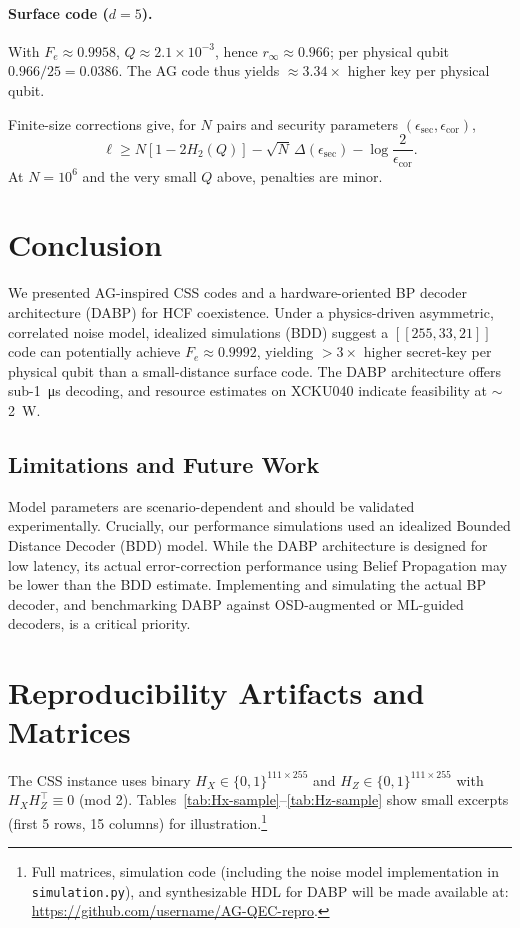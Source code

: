 \paragraph*{Surface code (\(d=5\)).}
With \(F_e\approx0.9958\), \(Q\approx2.1\times10^{-3}\), hence \(r_\infty\approx0.966\); per physical qubit \(0.966/25=0.0386\). The AG code thus yields \(\approx3.34\times\) higher key per physical qubit.

Finite-size corrections give, for \(N\) pairs and security parameters \((\epsilon_{\mathrm{sec}},\epsilon_{\mathrm{cor}})\),
\begin{equation}
\ell \ge N\!\left[1-2H_2(Q)\right]-\sqrt{N}\,\Delta(\epsilon_{\mathrm{sec}})-\log\frac{2}{\epsilon_{\mathrm{cor}}}.
\end{equation}
At \(N=10^6\) and the very small \(Q\) above, penalties are minor.

\section{Conclusion}\label{sec:conclusion}
We presented AG-inspired CSS codes and a hardware-oriented BP decoder architecture (DABP) for HCF coexistence. Under a physics-driven asymmetric, correlated noise model, idealized simulations (BDD) suggest a \( [[255,33,21]] \) code can potentially achieve \(F_e\approx0.9992\), yielding \(>\!3\times\) higher secret-key per physical qubit than a small-distance surface code. The DABP architecture offers sub-\SI{1}{\micro\second} decoding, and resource estimates on XCKU040 indicate feasibility at \(\sim\)\SI{2}{\watt}.

\subsection*{Limitations and Future Work}
Model parameters are scenario-dependent and should be validated experimentally. Crucially, our performance simulations used an idealized Bounded Distance Decoder (BDD) model. While the DABP architecture is designed for low latency, its actual error-correction performance using Belief Propagation may be lower than the BDD estimate. Implementing and simulating the actual BP decoder, and benchmarking DABP against OSD-augmented or ML-guided decoders, is a critical priority.

\appendix

\section{Reproducibility Artifacts and Matrices}
The CSS instance uses binary \(H_X\in\{0,1\}^{111\times 255}\) and \(H_Z\in\{0,1\}^{111\times 255}\) with \(H_X H_Z^\top\equiv0\) (mod 2). Tables~\ref{tab:Hx-sample}--\ref{tab:Hz-sample} show small excerpts (first 5 rows, 15 columns) for illustration.\footnote{Full matrices, simulation code (including the noise model implementation in \texttt{simulation.py}), and synthesizable HDL for DABP will be made available at: \url{https://github.com/username/AG-QEC-repro}.}

